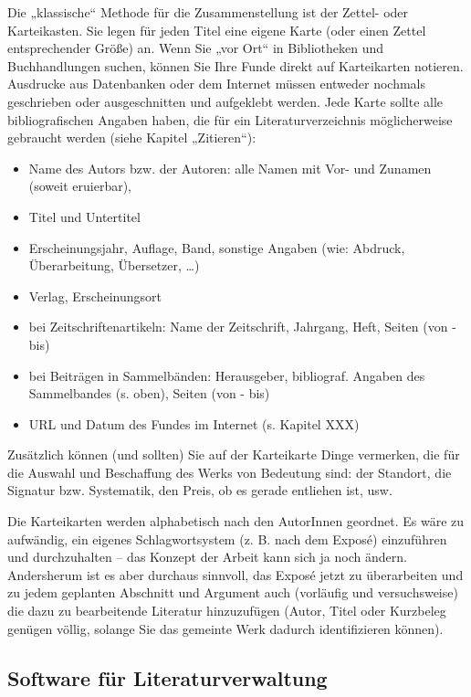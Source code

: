 \documentclass[]{book}
\providecommand{\tightlist}{%
  \setlength{\itemsep}{0pt}\setlength{\parskip}{0pt}}
\theoremstyle{definition}
\theoremstyle{definition}
\theoremstyle{definition}
\theoremstyle{remark}
\begin{document}
Die „klassische`` Methode für die Zusammenstellung ist der Zettel- oder
Karteikasten. Sie legen für jeden Titel eine eigene Karte (oder einen
Zettel entsprechender Größe) an. Wenn Sie „vor Ort`` in Bibliotheken und
Buchhandlungen suchen, können Sie Ihre Funde direkt auf Karteikarten
notieren. Ausdrucke aus Datenbanken oder dem Internet müssen entweder
nochmals geschrieben oder ausgeschnitten und aufgeklebt werden. Jede
Karte sollte alle bibliografischen Angaben haben, die für ein
Literaturverzeichnis möglicherweise gebraucht werden (siehe Kapitel
„Zitieren``):

\begin{itemize}
\tightlist
\item
  Name des Autors bzw. der Autoren: alle Namen mit Vor- und Zunamen
  (soweit eruierbar),
\item
  Titel und Untertitel
\item
  Erscheinungsjahr, Auflage, Band, sonstige Angaben (wie: Abdruck,
  Überarbeitung, Übersetzer, \ldots{})
\item
  Verlag, Erscheinungsort
\item
  bei Zeitschriftenartikeln: Name der Zeitschrift, Jahrgang, Heft,
  Seiten (von - bis)
\item
  bei Beiträgen in Sammelbänden: Herausgeber, bibliograf. Angaben des
  Sammelbandes (s. oben), Seiten (von - bis)
\item
  URL und Datum des Fundes im Internet (s. Kapitel XXX)
\end{itemize}

Zusätzlich können (und sollten) Sie auf der Karteikarte Dinge vermerken,
die für die Auswahl und Beschaffung des Werks von Bedeutung sind: der
Standort, die Signatur bzw. Systematik, den Preis, ob es gerade
entliehen ist, usw.

Die Karteikarten werden alphabetisch nach den AutorInnen geordnet. Es
wäre zu aufwändig, ein eigenes Schlagwortsystem (z. B. nach dem Exposé)
einzuführen und durchzuhalten -- das Konzept der Arbeit kann sich ja
noch ändern. Andersherum ist es aber durchaus sinnvoll, das Exposé jetzt
zu überarbeiten und zu jedem geplanten Abschnitt und Argument auch
(vorläufig und versuchsweise) die dazu zu bearbeitende Literatur
hinzuzufügen (Autor, Titel oder Kurzbeleg genügen völlig, solange Sie
das gemeinte Werk dadurch identifizieren können).

\subsection{Software für
Literaturverwaltung}\label{software-fur-literaturverwaltung}
\end{document}
